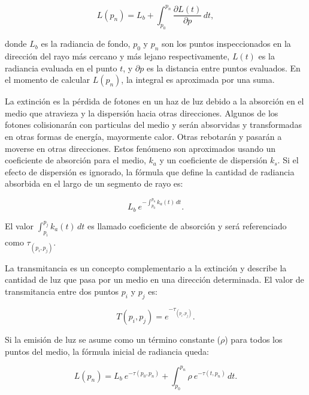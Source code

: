 \documentclass[oneside,a4paper,english,links]{amca}
\begin{document}
\begin{equation} \label{eq:general_radiance}  
  L(p_n) = L_b + \int_{p_0}^{p_n} \frac{\partial L(t)}{\partial p} \, dt,
\end{equation}

\noindent donde $L_b$ es la radiancia de fondo, $p_0$ y $p_n$ son los
puntos inspeccionados en la dirección del rayo más cercano y más
lejano respectivamente, $L(t)$ es la radiancia evaluada en el punto
$t$, y $\partial p$ es la distancia entre puntos evaluados. En el
momento de calcular $L(p_n)$, la integral es aproximada por una suma.

La extinción es la pérdida de fotones en un haz de luz debido a la
absorción en el medio que atravieza y la dispersión hacia otras
direcciones. Algunos de los fotones colisionarán con particulas del
medio y serán absorvidas y transformadas en otras formas de energía,
mayormente calor. Otras rebotarán y pasarán a moverse en otras
direcciones. Estos fenómeno son aproximados usando un coeficiente de
absorción para el medio, $k_a$ y un coeficiente de dispersión
$k_s$. Si el efecto de dispersión es ignorado, la fórmula que define
la cantidad de radiancia absorbida en el largo de un segmento de rayo
es: 

\begin{equation} \label{eq:radiance_absorption}  
    L_b \ \displaystyle e^{-\int_{p_0}^{p_n} k_a(t) \, dt}.
\end{equation}

El valor $\int_{p_i}^{p_j} k_a(t) \, dt$ es llamado coeficiente de
absorción y será referenciado como $\tau_{(p_i, p_j)}$.

La transmitancia es un concepto complementario a la extinción y
describe la cantidad de luz que pasa por un medio en una dirección
determinada. El valor de transmitancia entre dos puntos $p_i$ y $p_j$
es:

\begin{equation} \label{eq:general_radiance}  
  T(p_i,p_j) = e^{-\tau_{(p_i, p_j)}}.
\end{equation}

Si la emisión de luz se asume como un término constante ($\rho$) para
todos los puntos del medio, la fórmula inicial de radiancia queda:

\begin{equation} \label{eq:ray_radiance}  
  L(p_n) = L_b \ e^{-\tau(p_0, p_n)} + \int_{p_0}^{p_n} \rho \ e^{-\tau(t,p_n)} \, dt.
\end{equation}
\end{document}
